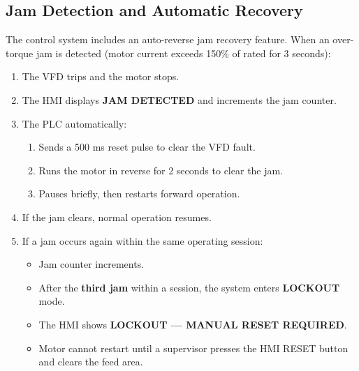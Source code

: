 \documentclass[hidelinks,12pt]{article}
\begin{document}
\subsection{Jam Detection and Automatic Recovery}
The control system includes an auto-reverse jam recovery feature. When an over-torque jam is detected (motor current exceeds 150\% of rated for 3 seconds):

\begin{enumerate}
    \item The VFD trips and the motor stops.
    \item The HMI displays \textbf{JAM DETECTED} and increments the jam counter.
    \item The PLC automatically:
        \begin{enumerate}
            \item Sends a 500 ms reset pulse to clear the VFD fault.
            \item Runs the motor in reverse for 2 seconds to clear the jam.
            \item Pauses briefly, then restarts forward operation.
        \end{enumerate}
    \item If the jam clears, normal operation resumes.
    \item If a jam occurs again within the same operating session:
        \begin{itemize}
            \item Jam counter increments.
            \item After the \textbf{third jam} within a session, the system enters \textbf{LOCKOUT} mode.
            \item The HMI shows \textbf{LOCKOUT — MANUAL RESET REQUIRED}.
            \item Motor cannot restart until a supervisor presses the HMI RESET button and clears the feed area.
        \end{itemize}
\end{enumerate}
\end{document}
